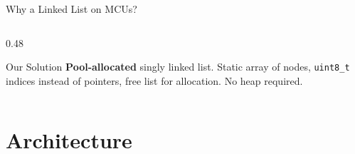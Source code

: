 \documentclass[aspectratio=169, 10pt]{beamer}
\begin{document}
\begin{frame}{Why a Linked List on MCUs?}
\begin{columns}[T]
\begin{column}{0.48\textwidth}
\vspace{0.5em}
\begin{alertblock}{Our Solution}
\textbf{Pool-allocated} singly linked list. Static array of nodes,
\texttt{uint8\_t} indices instead of pointers, free list for allocation.
No heap required.
\end{alertblock}
\end{column}
\end{columns}
\end{frame}

\section{Architecture}
\end{document}
